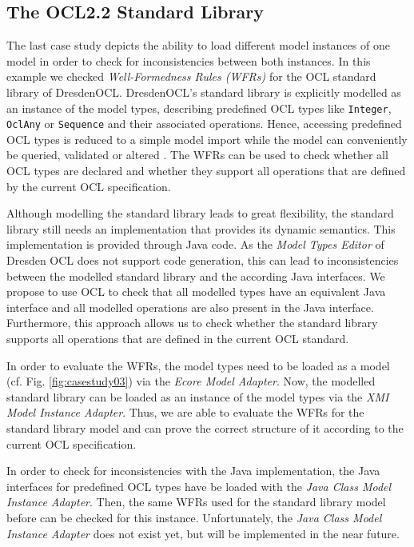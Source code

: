 \subsection{The OCL2.2 Standard Library}
The last case study depicts the ability to load different model instances of one model 
in order to check for inconsistencies between both instances. In this example we 
checked \textit{Well-Formedness Rules (WFRs)} for the OCL standard library of DresdenOCL. 
DresdenOCL's standard library is explicitly modelled as 
an instance of the model types, describing predefined OCL types like \texttt{Integer}, 
\texttt{OclAny} or \texttt{Sequence} and their associated operations. 
Hence, accessing predefined OCL types is reduced to a simple model 
import while the model can conveniently be queried, validated or altered 
\cite{braeuerOCL07}. The WFRs can be used to check whether all OCL types are 
declared and whether they support all operations that are defined by the 
current OCL specification.

Although modelling the standard library leads to great flexibility, the standard library 
still needs an implementation that provides its dynamic semantics. 
This implementation is provided through Java code. As the \textit{Model Types Editor} of Dresden OCL
does not support code generation, this can lead to inconsistencies between 
the modelled standard library and the according Java interfaces.
We propose to use OCL to check that all modelled types have an equivalent Java 
interface and all modelled operations are also present in the Java interface. Furthermore, 
this approach allows us to check whether the standard library supports all operations that 
are defined in the current OCL standard.

In order to evaluate the WFRs, the model types need to be loaded as a model (cf. Fig. 
\ref{fig:casestudy03})  via the \textit{Ecore Model Adapter}. Now, the modelled standard library 
can be loaded as an instance of the model types via the \textit{XMI Model Instance Adapter}. Thus, 
we are able to evaluate the WFRs for the standard library model and can prove the correct 
structure of it according to the current OCL specification. 

In order to check for inconsistencies with the Java implementation, the Java interfaces 
for predefined OCL types have  be loaded with the \textit{Java Class Model Instance Adapter}. Then, the same WFRs 
used for the standard library model before can be checked for this instance. 
Unfortunately, the \textit{Java Class Model Instance Adapter} does not exist yet, but will be 
implemented in the near future.


